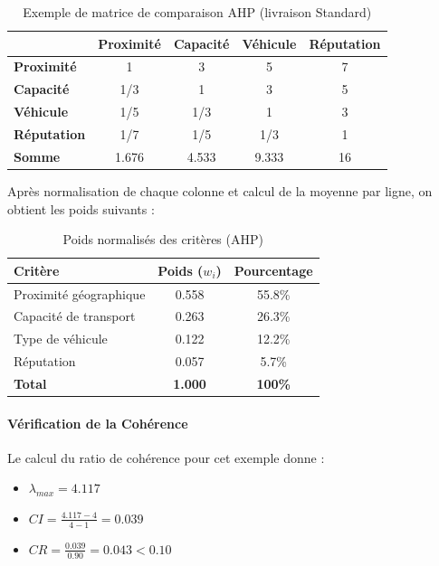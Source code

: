 \documentclass[11pt,a4paper]{report}
\begin{document}
\begin{table}[H]
    \centering
    \caption{Exemple de matrice de comparaison AHP (livraison Standard)}
    \label{tab:ahp_example}
    \begin{tabular}{|l|c|c|c|c|}
        \hline
        & \textbf{Proximité} & \textbf{Capacité} & \textbf{Véhicule} & \textbf{Réputation} \\
        \hline
        \textbf{Proximité} & 1 & 3 & 5 & 7 \\
        \textbf{Capacité} & 1/3 & 1 & 3 & 5 \\
        \textbf{Véhicule} & 1/5 & 1/3 & 1 & 3 \\
        \textbf{Réputation} & 1/7 & 1/5 & 1/3 & 1 \\
        \hline
        \textbf{Somme} & 1.676 & 4.533 & 9.333 & 16 \\
        \hline
    \end{tabular}
\end{table}

Après normalisation de chaque colonne et calcul de la moyenne par ligne, on obtient les poids suivants :

\begin{table}[H]
    \centering
    \caption{Poids normalisés des critères (AHP)}
    \label{tab:ahp_weights}
    \begin{tabular}{|l|c|c|}
        \hline
        \textbf{Critère} & \textbf{Poids ($w_i$)} & \textbf{Pourcentage} \\
        \hline
        Proximité géographique & 0.558 & 55.8\% \\
        Capacité de transport & 0.263 & 26.3\% \\
        Type de véhicule & 0.122 & 12.2\% \\
        Réputation & 0.057 & 5.7\% \\
        \hline
        \textbf{Total} & \textbf{1.000} & \textbf{100\%} \\
        \hline
    \end{tabular}
\end{table}

\paragraph{Vérification de la Cohérence}

Le calcul du ratio de cohérence pour cet exemple donne :
\begin{itemize}
    \item $\lambda_{max} = 4.117$
    \item $CI = \frac{4.117 - 4}{4 - 1} = 0.039$
    \item $CR = \frac{0.039}{0.90} = 0.043 < 0.10$ \quad \checkmark
\end{itemize}
\end{document}
